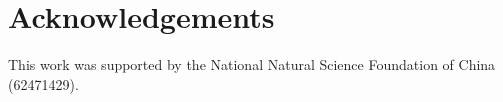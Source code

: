\documentclass[preprint,10pt]{elsarticle}
\begin{document}
\section*{Acknowledgements}
This work was supported by the National Natural Science Foundation of China (62471429).


\makeatletter{}\makeatother


\end{document}
